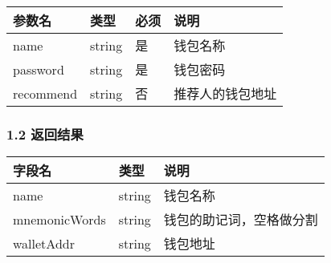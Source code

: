 \documentclass[letterpaper,10pt,english]{sphinxmanual}
\begin{document}
\begin{savenotes}\sphinxattablestart
\centering
\begin{tabulary}{\linewidth}[t]{|T|T|T|T|}
\hline
\sphinxstyletheadfamily 
参数名
&\sphinxstyletheadfamily 
类型
&\sphinxstyletheadfamily 
必须
&\sphinxstyletheadfamily 
说明
\\
\hline
name
&
string
&
是
&
钱包名称
\\
\hline
password
&
string
&
是
&
钱包密码
\\
\hline
recommend
&
string
&
否
&
推荐人的钱包地址
\\
\hline
\end{tabulary}
\par
\sphinxattableend\end{savenotes}


\subsubsection{1.2 返回结果}
\label{\detokenize{BCBWalletSDK_u63a5_u53e3_u8bf4_u660e:id20}}

\begin{sphinxVerbatim}[commandchars=\\\{\}]
     
\end{sphinxVerbatim}



\begin{savenotes}\sphinxattablestart
\centering
\begin{tabulary}{\linewidth}[t]{|T|T|T|}
\hline
\sphinxstyletheadfamily 
字段名
&\sphinxstyletheadfamily 
类型
&\sphinxstyletheadfamily 
说明
\\
\hline
name
&
string
&
钱包名称
\\
\hline
mnemonicWords
&
string
&
钱包的助记词，空格做分割
\\
\hline
walletAddr
&
string
&
钱包地址
\\
\hline
\end{tabulary}
\par
\sphinxattableend\end{savenotes}
\end{document}
